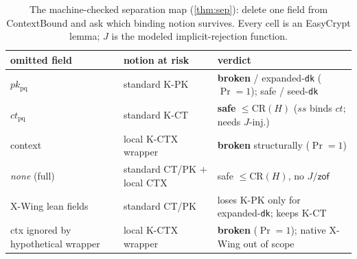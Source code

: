 \documentclass[journal]{IEEEtran}
\newcommand{\code}[1]{\texttt{\small #1}}
\begin{document}
\begin{table}[t]\centering\footnotesize
\setlength{\tabcolsep}{3pt}\renewcommand{\arraystretch}{1.15}
\caption{The machine-checked separation map (\cref{thm:sep}): delete one field from ContextBound and
ask which binding notion survives. Every cell is an EasyCrypt lemma; $J$ is the modeled
implicit-rejection function.}
\label{tab:sepmap}
\begin{tabular}{@{}>{\raggedright\arraybackslash}p{}
>{\raggedright\arraybackslash}p{}
>{\raggedright\arraybackslash}p{}@{}}
\toprule
omitted field & notion at risk & verdict \\
\midrule
$pk_{\mathrm{pq}}$ & standard K-PK & \textbf{broken} / expanded-\code{dk} ($\Pr{=}1$); safe / seed-\code{dk} \\
$ct_{\mathrm{pq}}$ & standard K-CT & \textbf{safe} $\le\mathrm{CR}(H)$ ($ss$ binds $ct$; needs $J$-inj.) \\
context & local K-CTX wrapper & \textbf{broken} structurally ($\Pr{=}1$) \\
\midrule
\emph{none} (full) & standard CT/PK $+$ local CTX & safe $\le\mathrm{CR}(H)$, no $J/\mathsf{zof}$ \\
X-Wing lean fields & standard CT/PK & loses K-PK only for expanded-\code{dk}; keeps K-CT \\
ctx ignored by hypothetical wrapper & local K-CTX wrapper & \textbf{broken} ($\Pr{=}1$); native X-Wing out of scope \\
\bottomrule
\end{tabular}
\end{table}
\end{document}
